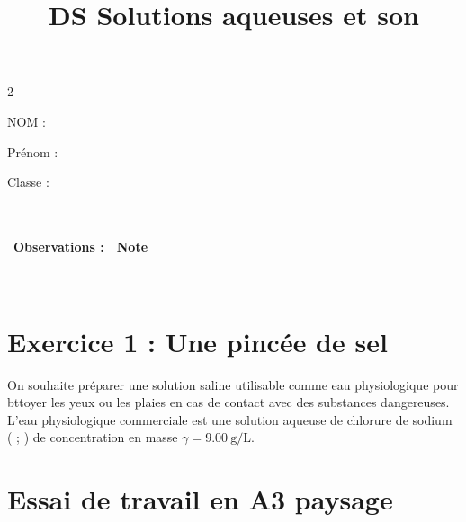 \documentclass[12pt]{scrartcl}
\begin{document}
\begin{multicols}{2}
\title{DS Solutions aqueuses et son}
\begin{minipage}{.4\linewidth}
    NOM :
\end{minipage}
\begin{minipage}{.4\linewidth}
    Prénom :
\end{minipage}
\begin{minipage}{.2\linewidth}
    Classe :
\end{minipage}\\

\begin{tabular}{p{.7\linewidth}|p{.22\linewidth}}
    \hline
    Observations : \vspace{3em}& Note \\
    \hline
\end{tabular}\\

\section{Exercice 1 : Une pincée de sel}
On souhaite préparer une solution saline utilisable comme eau physiologique pour bttoyer les yeux ou les plaies en cas de contact avec des substances dangereuses.\\
L'eau physiologique commerciale est une solution aqueuse de chlorure de sodium ( ; ) de concentration en masse $\gamma = \SI{9,00}{\gram\per\liter}$.
    \section{Essai de travail en A3 paysage}
\end{multicols}
\end{document}
